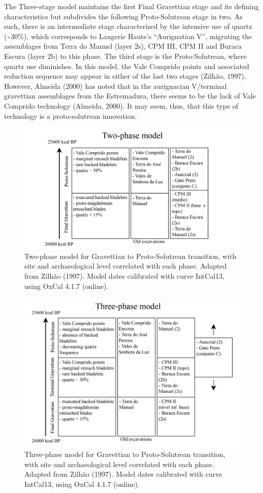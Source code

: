 \documentclass[12pt,twoside]{reedthesis}
\begin{document}
The Three-stage model maintains the first Final Gravettian stage and its defining characteristics but subdivides the following Proto-Solutrean stage in two. As such, there is an intermediate stage characterized by the intensive use of quartz (\textasciitilde30\%), which corresponds to Laugerie Haute's ``Aurignatian V'', migrating the assemblages from Terra do Manuel (layer 2s), CPM III, CPM II and Buraca Escura (layer 2b) to this phase. The third stage is the Proto-Solutrean, where quartz use diminishes. In this model, the Vale Comprido points and associated reduction sequence may appear in either of the last two stages (Zilhão, 1997). However, Almeida (2000) has noted that in the aurignacian V/terminal gravettian assemblages from the Estremadura, there seems to be the lack of Vale Comprido technology (Almeida, 2000). It may seem, thus, that this type of technology is a proto-solutrean innovation.
\begin{figure}
\includegraphics[width=0.8\linewidth]{figure/Two-phasemodel} \caption{Two-phase model for Gravettian to Proto-Solutrean transition, with site and archaeological level correlated with each phase. Adapted from Zilhão (1997). Model dates calibrated with curve IntCal13, using OxCal 4.1.7 (online).}\label{fig:unnamed-chunk-1}
\end{figure}
\begin{figure}
\includegraphics[width=0.8\linewidth]{figure/Three-phasemodel} \caption{Three-phase model for Gravettian to Proto-Solutrean transition, with site and archaeological level correlated with each phase. Adapted from Zilhão (1997). Model dates calibrated with curve IntCal13, using OxCal 4.1.7 (online).}\label{fig:unnamed-chunk-2}
\end{figure}
\end{document}
